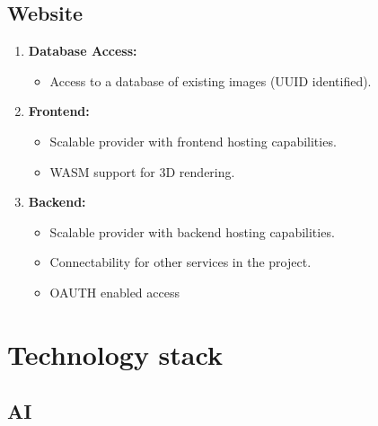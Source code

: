 \section{Website}
\begin{enumerate}
    \item \textbf{Database Access:}
    \begin{itemize}
    \item Access to a database of existing images (UUID identified).
    \end{itemize}

\item \textbf{Frontend:}
    \begin{itemize}
    \item Scalable provider with frontend hosting capabilities.
    \item WASM support for 3D rendering.
    \end{itemize}

\item \textbf{Backend:}
    \begin{itemize}
    \item Scalable provider with backend hosting capabilities.
    \item Connectability for other services in the project.
    \item OAUTH enabled access
    \end{itemize}
\end{enumerate}

\chapter{Technology stack}
\section{AI}

